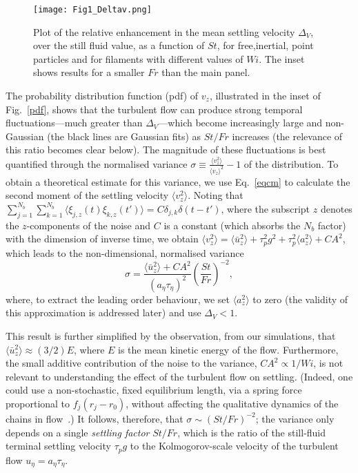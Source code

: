 \documentclass[aps,prl,twocolumn,superscriptaddress,floatfix,tightenlines,showpacs,notitlepage]{revtex4-1}
\begin{document}
\begin{figure}
\texttt{[image: Fig1\_Deltav.png]}
	\caption{Plot of the relative enhancement in the mean settling velocity $\Delta_V$, over the still fluid value, as a function of $St$, for free,inertial, point particles and for filaments with different values of $Wi$. The inset shows results for a smaller $Fr$ than the main panel.}
\label{Delta_v}
\end{figure}

The probability distribution function (pdf) of $v_z$, illustrated in the inset of Fig.~\ref{pdf}, shows that the turbulent flow can produce strong temporal fluctuations---much greater than $\Delta_V$---which become increasingly large and non-Gaussian (the black lines are Gaussian fits) as $St/Fr$ increases (the relevance of this ratio becomes clear below). The magnitude of these fluctuations is best quantified through the 
normalised variance $\sigma
\equiv \frac{\langle v^2_z\rangle}{\langle v_z \rangle^2} - 1$ of the
distribution. To obtain a theoretical estimate for this variance, we use Eq.~\eqref{eqcm} to calculate the second moment of the settling velocity $\langle v_z^2 \rangle$. 
Noting that $\sum_{j = 1}^{N_b} \sum_{k = 1}^{N_b} \langle \xi_{j,z}(t)\xi_{k,z}(t')\rangle = C\delta_{j,k}\delta(t-t')$, where the subscript $z$ 
denotes the $z$-components of the noise and $C$ is a constant (which absorbs the $N_b$ factor) with the dimension of inverse time, we obtain  
$\langle v_z^2 \rangle = \langle \bar{u}_z^2 \rangle + \tau_p^2 g^2 + \tau_p^2\langle a_z^2 \rangle + CA^2$, which
leads to the non-dimensional, normalised variance
\begin{equation}
	\sigma = \frac{\langle \bar{u}_z^2 \rangle + CA^2}{(a_\eta \tau_\eta)^2} \left(\frac{St}{Fr}\right)^{-2}, 
\label{variance}
\end{equation}
where, to extract the leading order behaviour, 
we set $\langle a_z^2 \rangle$ to zero 
(the validity of this approximation is addressed later) and use $\Delta_V < 1$.

This result is further simplified by the observation, from our simulations, that $\langle \bar{u}_z^2 \rangle \approx (3/2)E$, where $E$ is the mean kinetic energy of the flow. Furthermore, the small additive contribution of the noise to the variance, $CA^2 \propto 1/Wi$, is not relevant to understanding the effect of the turbulent flow on settling. (Indeed, one could use a non-stochastic, fixed equilibrium length, via a spring force proportional to $f_j (r_j - r_0)$, without affecting the qualitative dynamics of the chains in flow~\cite{RoyalChains}.) It follows, therefore, that $\sigma \sim (St/Fr)^{-2}$; the variance only depends on a single \textit{settling factor} $St/Fr$, which is the ratio of the still-fluid terminal settling velocity $\tau_p g$ to the Kolmogorov-scale velocity of the turbulent flow $u_{\eta} = a_\eta \tau_\eta$. 
\end{document}
